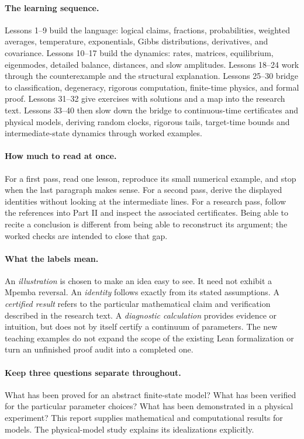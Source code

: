 \paragraph{The learning sequence.}
Lessons 1--9 build the language: logical claims, fractions, probabilities,
weighted averages, temperature, exponentials, Gibbs distributions, derivatives,
and covariance. Lessons 10--17 build the dynamics: rates, matrices,
equilibrium, eigenmodes, detailed balance, distances, and slow amplitudes.
Lessons 18--24 work through the counterexample and the structural explanation.
Lessons 25--30 bridge to classification, degeneracy, rigorous computation,
finite-time physics, and formal proof. Lessons 31--32 give exercises with
solutions and a map into the research text. Lessons 33--40 then slow down
the bridge to continuous-time certificates and physical models, deriving
random clocks, rigorous tails, target-time bounds and intermediate-state
dynamics through worked examples.

\paragraph{How much to read at once.}
For a first pass, read one lesson, reproduce its small numerical example, and
stop when the last paragraph makes sense. For a second pass, derive the displayed
identities without looking at the intermediate lines. For a research pass,
follow the references into Part II and inspect the associated certificates.
Being able to recite a conclusion is different from being able to reconstruct
its argument; the worked checks are intended to close that gap.

\paragraph{What the labels mean.}
An \emph{illustration} is chosen to make an idea easy to see. It need not exhibit
a Mpemba reversal. An \emph{identity} follows exactly from its stated assumptions.
A \emph{certified result} refers to the particular mathematical claim and
verification described in the research text. A \emph{diagnostic calculation}
provides evidence or intuition, but does not by itself certify a continuum of
parameters. The new teaching examples do not expand the scope of the existing
Lean formalization or turn an unfinished proof audit into a completed one.

\paragraph{Keep three questions separate throughout.}
What has been proved for an abstract finite-state model? What has been verified
for the particular parameter choices? What has been demonstrated in a physical
experiment? This report supplies mathematical and computational results for
models. The physical-model study explains its idealizations explicitly.

